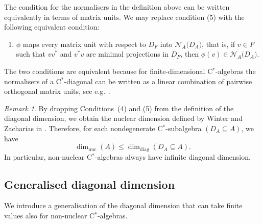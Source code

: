 \documentclass[a4paper]{amsart}
\newcommand{\myhyp}{\textnormal{-}\hskip0pt\relax}
\numberwithin{equation}{section}
\newcommand{\cstar}{C$^\ast$\myhyp{}algebra}
\newcommand{\cstarSub}{C$^\ast$\myhyp{}subalgebra}
\newcommand{\cstarDiag}{C$^\ast$\myhyp{}diagonal}
\newcommand{\normalisers}[2]{{\mathcal{N}}_{#2}{\big({#1}\big)}}
\newcommand{\dimnuc}[1]{\dim_{\mathrm{nuc}}({#1})}
\newcommand{\ddim}[2]{\dim_{\mathrm{diag}}({#1}\subseteq{#2})}
\theoremstyle{plain}
\theoremstyle{indented}
\numberwithin{equation}{section}
\theoremstyle{definition}
\theoremstyle{remark}
\newtheorem{rmk}[thm]{Remark}
\theoremstyle{plain}
\theoremstyle{definition}
\begin{document}
The condition for the normalisers in the definition above can be written 
equivalently in terms of matrix units.
We may replace condition (5) with the following equivalent condition:
\begin{enumerate}
        \item[(5')] $\phi$ maps every matrix unit with respect to $D_F$ into $\normalisers{D_A}{A}$, that is, if ${v\in F}$ such that ${v v^\ast}$ and ${v^\ast v}$ are minimal projections in ${D_F}$, then ${\phi(v) \in \normalisers{D_A}{A}}$.
    \end{enumerate}
The two conditions are equivalent because for finite\myhyp{}dimensional \cstar{}s 
the normalisers of a \cstarDiag{} can be written as a linear combination of pairwise orthogonal matrix units, see e.g.~\cite[Example 2]{Kumjian1986onCDiagonals}.

\begin{rmk} \label{rmk:diagDimVsNucDim}
    By dropping Conditions~(4) and (5) from the definition of the diagonal dimension,
    we obtain the nuclear dimension defined by Winter and Zacharias in \cite{WinterZacharias2010nucDim}.
Therefore, for each nondegenerate \cstarSub{} ${(D_A \subseteq A)}$, we have
\begin{equation*}
    \dimnuc{A} \le \ddim{D_A}{A}.
\end{equation*}
In particular, non\myhyp{}nuclear \cstar{}s always have infinite diagonal dimension.
\end{rmk}



\subsection{Generalised diagonal dimension}

We introduce a generalisation of the diagonal dimension that can take finite values also for non\myhyp{}nuclear \cstar{}s.
\end{document}
